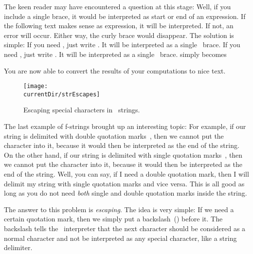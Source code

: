 %
The keen reader may have encountered a question at this stage:
\emph{}
Well, if you include a single brace, it would be interpreted as start or end of an expression.
If the following text makes sense as expression, it will be interpreted.
If not, an error will occur.
Either way, the curly brace would disappear.
The solution is simple:
If you need \inQuotes{\textbraceleft}, just write \inQuotes{\textbraceleft\textbraceleft}.\pythonIdx{\textbraceleft}\pythonIdx{\textbraceleft\textbraceleft}
It will be interpreted as a single \inQuotes{\textbraceleft}~brace.
If you need \inQuotes{\textbraceright}, just write \inQuotes{\textbraceright\textbraceright}.\pythonIdx{\textbraceright}\pythonIdx{\textbraceright\textbraceright}
It will be interpreted as a single \inQuotes{\textbraceright}~brace.
 simply becomes 

You are now able to convert the results of your computations to nice text.%
\endhsection%
%
%
%
\begin{figure}%
\centering%
\texttt{[image: \\currentDir/strEscapes]}%
\caption{Escaping special characters in \python\ strings.}%
\label{fig:strEscapes}%
\end{figure}%
%
The last example of f-strings brought up an interesting topic:
For example, if our string is delimited with double quotation marks~\pythonIdx{\textquotedbl}, then we cannot put the character  into it, because it would then be interpreted as the end of the string.
On the other hand, if our string is delimited with single quotation marks~\pythonIdx{\textquotesingle}, then we cannot put the character  into it, because it would then be interpreted as the end of the string.
Well, you can say, if I need a double quotation mark, then I will delimit my string with single quotation marks and vice versa.
This is all good as long as you do not need \emph{both} single and double quotation marks inside the string.

The answer to this problem is \emph{escaping}.
The idea is very simple:
If we need a certain quotation mark, then we simply put a backslash~(\inQuotes{\textbackslash})\pythonIdx{\textbackslash} before it.
The backslash tells the \python\ interpreter that the next character should be considered as a normal character and not be interpreted as any special character, like a string delimiter.

